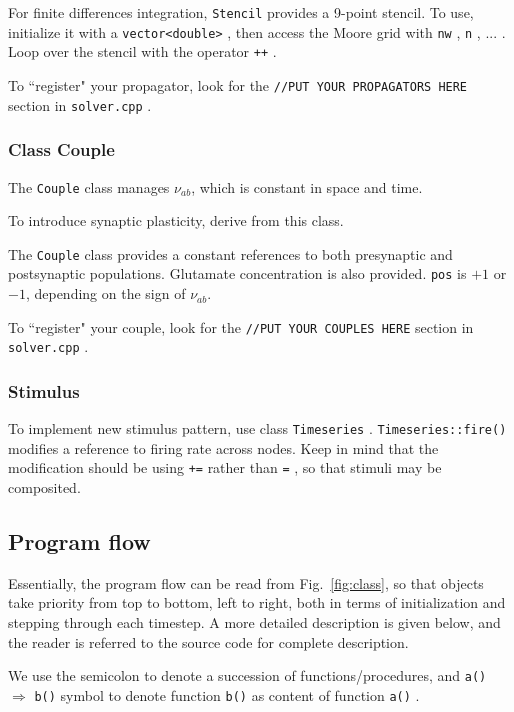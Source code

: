 \documentclass[12pt,a4paper]{article}
\newcommand{\type}[1]{ {\small\small\tt #1} }
\begin{document}
For finite differences integration, \type{Stencil} provides a 9-point stencil. To use, initialize it with a \type{vector<double>}, then access the Moore grid with \type{nw}, \type{n}, ... . Loop over the stencil with the operator \type{++}.

To ``register" your propagator, look for the \type{//PUT YOUR PROPAGATORS HERE} section in \type{solver.cpp}.

\subsubsection{Class Couple}
\label{sec:newcouple}

The \type{Couple} class manages \(\nu_{ab}\), which is constant in space and time.

To introduce synaptic plasticity, derive from this class.

The \type{Couple} class provides a constant references to both presynaptic and postsynaptic populations. Glutamate concentration is also provided. \type{pos} is $+1$ or $-1$, depending on the sign of \(\nu_{ab}\).

To ``register" your couple, look for the \type{//PUT YOUR COUPLES HERE} section in \type{solver.cpp}.

\subsubsection{Stimulus}

To implement new stimulus pattern, use class \type{Timeseries}. \type{Timeseries::fire()} modifies a reference to firing rate across nodes. Keep in mind that the modification should be using \type{+=} rather than \type{=}, so that stimuli may be composited.

\subsection{Program flow}

Essentially, the program flow can be read from Fig.~\ref{fig:class}, so that objects take priority from top to bottom, left to right, both in terms of initialization and stepping through each timestep. A more detailed description is given below, and the reader is referred to the source code for complete description.

We use the semicolon to denote a succession of functions/procedures, and \type{a()} $\Rightarrow$ \type{b()} symbol to denote function \type{b()} as content of function \type{a()}.
\end{document}
